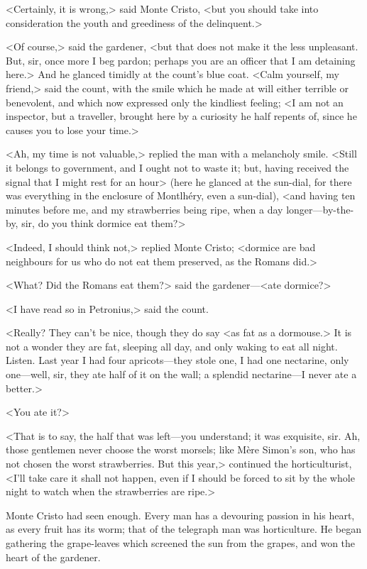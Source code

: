  <Certainly, it is wrong,> said Monte Cristo, <but you should take into consideration the youth and greediness of the delinquent.> 

 <Of course,> said the gardener, <but that does not make it the less unpleasant. But, sir, once more I beg pardon; perhaps you are an officer that I am detaining here.> And he glanced timidly at the count's blue coat.  <Calm yourself, my friend,> said the count, with the smile which he made at will either terrible or benevolent, and which now expressed only the kindliest feeling; <I am not an inspector, but a traveller, brought here by a curiosity he half repents of, since he causes you to lose your time.> 

 <Ah, my time is not valuable,> replied the man with a melancholy smile. <Still it belongs to government, and I ought not to waste it; but, having received the signal that I might rest for an hour> (here he glanced at the sun-dial, for there was everything in the enclosure of Montlhéry, even a sun-dial), <and having ten minutes before me, and my strawberries being ripe, when a day longer—by-the-by, sir, do you think dormice eat them?> 

 <Indeed, I should think not,> replied Monte Cristo; <dormice are bad neighbours for us who do not eat them preserved, as the Romans did.> 

 <What? Did the Romans eat them?> said the gardener—<ate dormice?> 

 <I have read so in Petronius,> said the count. 

 <Really? They can't be nice, though they do say <as fat as a dormouse.> It is not a wonder they are fat, sleeping all day, and only waking to eat all night. Listen. Last year I had four apricots—they stole one, I had one nectarine, only one—well, sir, they ate half of it on the wall; a splendid nectarine—I never ate a better.> 

 <You ate it?> 

 <That is to say, the half that was left—you understand; it was exquisite, sir. Ah, those gentlemen never choose the worst morsels; like Mère Simon's son, who has not chosen the worst strawberries. But this year,> continued the horticulturist, <I'll take care it shall not happen, even if I should be forced to sit by the whole night to watch when the strawberries are ripe.> 

 Monte Cristo had seen enough. Every man has a devouring passion in his heart, as every fruit has its worm; that of the telegraph man was horticulture. He began gathering the grape-leaves which screened the sun from the grapes, and won the heart of the gardener. 

